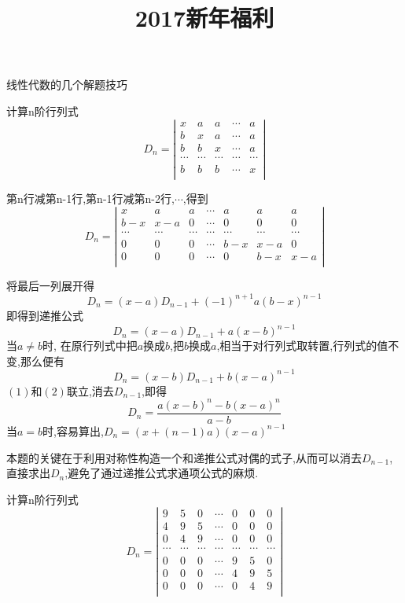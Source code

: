 \documentclass{ctexart}\pagestyle{empty}
\title{2017新年福利}
\begin{document}
\maketitle
线性代数的几个解题技巧


计算n阶行列式$$D_{n}=\left|
\begin{array}{ccccc}
x&a&a&\cdots&a\\
b&x&a&\cdots&a\\
b&b&x&\cdots&a\\
\cdots&\cdots&\cdots&\cdots&\cdots\\
b&b&b&\cdots&x\\
\end{array}
\right|$$



第n行减第n-1行,第n-1行减第n-2行,$\cdots$,得到
$$D_{n}=\left|
\begin{array}{cccccccc}
x&a&a&\cdots&a&a&a\\
b-x&x-a&0&\cdots&0&0&0\\
\cdots&\cdots&\cdots&\cdots&\cdots&\cdots&\cdots\\
0&0&0&\cdots&b-x&x-a&0\\
0&0&0&\cdots&0&b-x&x-a\\
\end{array}
\right|$$

将最后一列展开得$$D_{n}=(x-a)D_{n-1}+(-1)^{n+1}a(b-x)^{n-1}$$
即得到递推公式
\begin{equation}D_{n}=(x-a)D_{n-1}+a(x-b)^{n-1}
\end{equation}
当$a\neq b$时,
在原行列式中把$a$换成$b$,把$b$换成$a$,相当于对行列式取转置,行列式的值不变,那么便有
\begin{equation}
D_{n}=(x-b)D_{n-1}+b(x-a)^{n-1}
\end{equation}
$(1)$和$(2)$联立,消去$D_{n-1}$,即得$$D_{n}=\frac{a(x-b)^{n}-b(x-a)^{n}}{a-b}$$
当$a=b$时,容易算出,$D_{n}=(x+(n-1)a)(x-a)^{n-1}$


本题的关键在于利用对称性构造一个和递推公式对偶的式子,从而可以消去$D_{n-1}$,直接求出$D_{n}$,避免了通过递推公式求通项公式的麻烦.


计算n阶行列式$$D_{n}=\left|
\begin{array}{ccccccc}
9&5&0&\cdots&0&0&0\\
4&9&5&\cdots&0&0&0\\
0&4&9&\cdots&0&0&0\\
\cdots&\cdots&\cdots&\cdots&\cdots&\cdots&\cdots\\
0&0&0&\cdots&9&5&0\\
0&0&0&\cdots&4&9&5\\
0&0&0&\cdots&0&4&9\\
\end{array}
\right|$$
\end{document}
